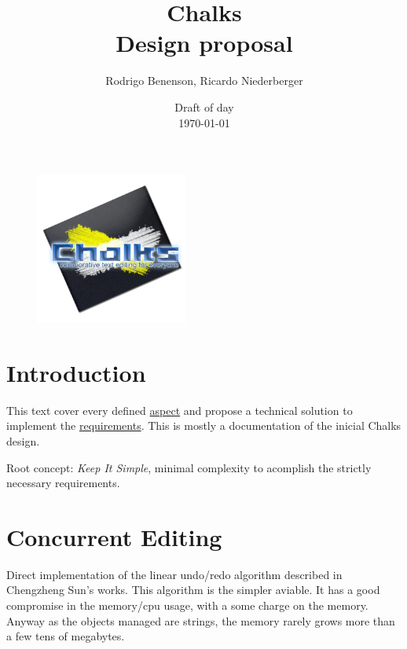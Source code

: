 \documentclass{article}
\title{\large Chalks \\ \huge Design proposal}
\author{Rodrigo Benenson, Ricardo Niederberger}
\date{Draft of day\\ \today}
\begin{document}
\begin{figure}[!t]
 \begin{center}
    \includegraphics[angle=0,width=5cm]{schemas/logo.jpg}
 \end{center}
\end{figure}


\maketitle
\thispagestyle{empty}

\newpage
\setcounter{page}{1}


\tableofcontents
\newpage
% 

\section{Introduction}

This text cover every defined \href{http://ryalias.freezope.org/Chalks/Aspects}{aspect} and propose a technical solution to implement the \href{http://ryalias.freezope.org/Chalks/ChalksRequirements}{requirements}.
This is mostly a documentation of the inicial Chalks design.


Root concept: \emph{Keep It Simple}, minimal complexity to acomplish the strictly necessary requirements.


\section{Concurrent Editing}

Direct implementation of the linear undo/redo algorithm described in Chengzheng Sun's works. This algorithm is the simpler aviable. It has a good compromise in the memory/cpu usage, with a some charge on the memory. Anyway as the objects managed are strings, the memory rarely grows more than a few tens of megabytes.
\end{document}
